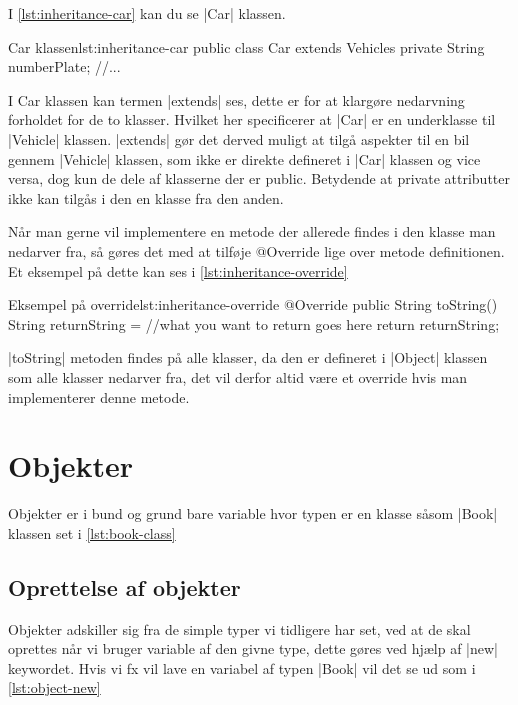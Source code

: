 I \autoref{lst:inheritance-car} kan du se \JavaInline|Car| klassen.

\begin{JavaCode}{Car klassen}{lst:inheritance-car}
	public class Car extends Vehicles
	{
		private String numberPlate;
		//...
	}
\end{JavaCode}

I Car klassen kan termen \JavaInline|extends| ses, dette er for at klargøre nedarvning forholdet for de to klasser. Hvilket her specificerer at \JavaInline|Car| er en underklasse til \JavaInline|Vehicle| klassen. \JavaInline|extends| gør det derved muligt at tilgå aspekter til en bil gennem \JavaInline|Vehicle| klassen, som ikke er direkte defineret i \JavaInline|Car| klassen og vice versa, dog kun de dele af klasserne der er public. Betydende at private attributter ikke kan tilgås i den en klasse fra den anden.

Når man gerne vil implementere en metode der allerede findes i den klasse man nedarver fra, så gøres det med at tilføje @Override lige over metode definitionen. Et eksempel på dette kan ses i \autoref{lst:inheritance-override}

\begin{JavaCode}{Eksempel på override}{lst:inheritance-override}
	@Override
	public String toString() {
		String returnString = //what you want to return goes here
		return returnString;
	}
\end{JavaCode}

\JavaInline|toString| metoden findes på alle klasser, da den er defineret i \JavaInline|Object| klassen som alle klasser nedarver fra, det vil derfor altid være et override hvis man implementerer denne metode.

\section{Objekter}

Objekter er i bund og grund bare variable hvor typen er en klasse såsom \JavaInline|Book| klassen set i \autoref{lst:book-class}

\subsection{Oprettelse af objekter}

Objekter adskiller sig fra de simple typer vi tidligere har set, ved at de skal oprettes når vi bruger variable af den givne type, dette gøres ved hjælp af \JavaInline|new| keywordet. Hvis vi fx vil lave en variabel af typen \JavaInline|Book| vil det se ud som i \autoref{lst:object-new}

